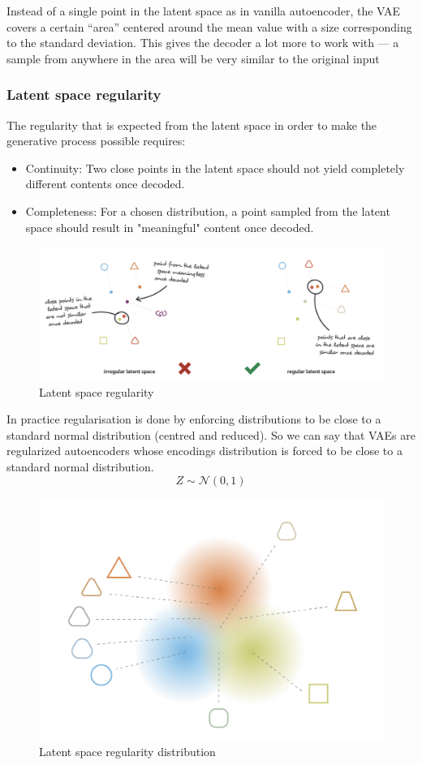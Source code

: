 \documentclass{article}
\begin{document}
			Instead of a single point in the latent space as in vanilla autoencoder, the VAE covers a certain “area” centered around the mean value with a size corresponding to the standard deviation. This gives the decoder a lot more to work with — a sample from anywhere in the area will be very similar to the original input
		
		\subsubsection{Latent space regularity}

			The regularity that is expected from the latent space in order to make the generative process possible requires:
			\begin{itemize}
			\item Continuity: Two close points in the latent space should not yield completely different contents once decoded.
			
			\item Completeness: For a chosen distribution, a point sampled from the latent space should result in "meaningful" content once decoded.
			\end{itemize}

			\begin{figure}[H]
				\centering
				\includegraphics[width=0.8\linewidth]{images/var-irr-reg.png}
				\caption{Latent space regularity}
				\label{fig:var-irr-reg}
			\end{figure}

			In practice regularisation is done by enforcing distributions to be close to a standard normal distribution (centred and reduced). 
			So we can say that VAEs are regularized autoencoders whose encodings distribution is forced to be close to a standard normal distribution.
			\[
				Z \sim \mathcal{N}(0, 1)
			\]

			\begin{figure}[H]
				\centering
				\includegraphics[width=0.8\linewidth]{images/vag-distribution.png}
				\caption{Latent space regularity distribution}
				\label{fig:vag-dist}
			\end{figure}
\end{document}
